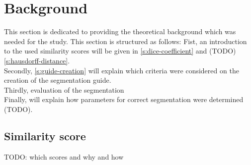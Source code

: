 
\chapter{Background}
\label{c:background}

 This section is dedicated to providing the theoretical background which was needed for the study.
This section is structured as follows:
Fist, an introduction to the used similarity scores will be given in \cref{s:dice-coefficient} and (TODO) \cref{s:hausdorff-distance}.\\
Secondly, \cref{s:guide-creation} will explain which criteria were considered on the creation of the segmentation guide.\\
Thirdly, evaluation of the segmentation\\
Finally,
will explain how parameters for correct segmentation were determined (TODO).

\section{Similarity score}
\label{s:similarity-score}
TODO: which scores and why and how






